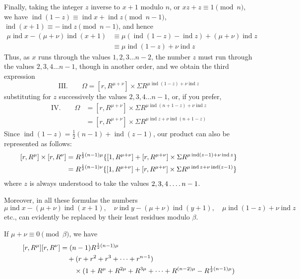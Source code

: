 Finally, taking the integer $z$ inverse to $x+1$ modulo
$n$, or $xz+z\equiv1\pmod n$, we have $\operatorname{ind}(1-z)\equiv\operatorname{ind}x+\operatorname{ind}z\pmod{n-1}$, $\operatorname{ind}(x+1)\equiv-\operatorname{ind}z\pmod{n-1}$, and hence
\[
\begin{aligned}
\mu\operatorname{ind}x-(\mu+\nu)\operatorname{ind}(x+1)&\equiv\mu(\operatorname{ind}(1-z)-\operatorname{ind}z)+(\mu+\nu)\operatorname{ind}z\\
&\equiv\mu\operatorname{ind}(1-z)+\nu\operatorname{ind}z
\end{aligned}
\]
Thus, as $x$ runs through the values $1,2,3\dots n-2$, the number $z$ must run through the values $2,3,4\dots n-1$, though in another order, and we obtain the third expression
\begingroup{}
\[
\text{III.}\qquad\Omega=[r,R^{\mu+\nu}]\times\Sigma R^{\mu\operatorname{ind}(1-z)+\nu\operatorname{ind}z}
\]
\endgroup
substituting for $z$ successively the values $2,3,4\dots n-1$, or, if you prefer,
\[
\begin{aligned}
\text{IV.}\qquad\Omega&=[r,R^{\mu+\nu}]\times\Sigma R^{\mu\operatorname{ind}(n+1-z)+\nu\operatorname{ind}z}\\
&=[r,R^{\mu+\nu}]\times\Sigma R^{\mu\operatorname{ind}z+\nu\operatorname{ind}(n+1-z)}
\end{aligned}
\]
Since $\operatorname{ind}(1-z)=\frac12(n-1)+\operatorname{ind}(z-1)$, our product can also be represented as follows:
\[
\begin{aligned}
\relax[r,R^\mu]\times[r,R^\nu]&=R^{\frac12(n-1)\mu}\{[1,R^{\mu+\nu}]+[r,R^{\mu+\nu}]\times\Sigma R^{\mu\operatorname{ind}(z-1)+\nu\operatorname{ind}z}\}\\
&=R^{\frac12(n-1)\nu}\{[1,R^{\mu+\nu}]+[r,R^{\mu+\nu}]\times\Sigma R^{\mu\operatorname{ind}z+\nu\operatorname{ind}(z-1)}\}
\end{aligned}
\]
where $z$ is always understood to take the values $2,3,4\mathinner{.\,.\,.\,.} n-1$.

Moreover, in all these formulas the numbers
\[
\mu\operatorname{ind}x-(\mu+\nu)\operatorname{ind}(x+1),\quad\nu\operatorname{ind}y-(\mu+\nu)\operatorname{ind}(y+1),\quad\mu\operatorname{ind}(1-z)+\nu\operatorname{ind}z
\]
etc., can evidently be replaced by their least residues modulo $\beta$.

If $\mu+\nu\equiv0\pmod\beta$, we have
\[
\begin{aligned}
\relax[r,R^\mu][r,R^\nu]&=(n-1)R^{\frac12(n-1)\mu}\\
&\quad+(r+r^2+r^3+\dots+r^{n-1})\\
&\qquad\times(1+R^\mu+R^{2\mu}+R^{3\mu}+\dots+R^{(n-2)\mu}-R^{\frac12(n-1)\mu})
\end{aligned}
\]

